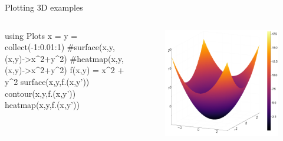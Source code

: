 \documentclass{beamer}
\newenvironment{Boxx}{\begin{tcolorbox}[standard jigsaw, opacityframe=0.8, opacityback=0.0,left=2pt,right=2pt,top=0pt,bottom=0pt]}{\end{tcolorbox}}
\begin{document}
\begin{frame}[fragile]{Plotting 3D examples}
	\begin{columns}
		
		\begin{Boxx}
		\begin{jllisting}
				using Plots
				x = y = collect(-1:0.01:1)
				#surface(x,y,(x,y)->x^2+y^2)
				#heatmap(x,y,(x,y)->x^2+y^2)
				f(x,y) = x^2 + y^2
				surface(x,y,f.(x,y'))
				contour(x,y,f.(x,y'))
				heatmap(x,y,f.(x,y'))
			\end{jllisting}
		\end{Boxx}		
		
		
		\begin{figure}
			\centering
			\includegraphics[width=\textwidth]{images_data/surf}
		\end{figure}
	\end{columns}
\end{frame}
\end{document}
